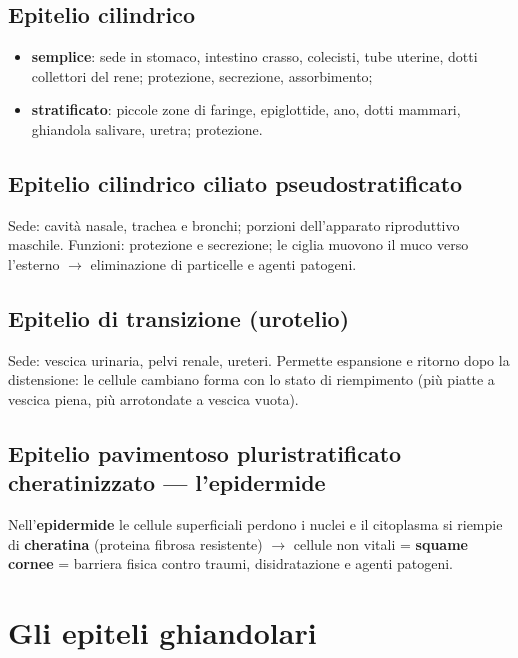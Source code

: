 \subsection{Epitelio cilindrico}
\begin{itemize}
  \item \textbf{semplice}: sede in stomaco, intestino crasso, colecisti, tube uterine, dotti
    collettori del rene; protezione, secrezione, assorbimento;
  \item \textbf{stratificato}: piccole zone di faringe, epiglottide, ano, dotti mammari, ghiandola
    salivare, uretra; protezione.
\end{itemize}

\subsection{Epitelio cilindrico ciliato pseudostratificato}
Sede: cavità nasale, trachea e bronchi; porzioni dell'apparato riproduttivo maschile. Funzioni:
protezione e secrezione; le ciglia muovono il muco verso l'esterno $\rightarrow$ eliminazione di
particelle e agenti patogeni.

\subsection{Epitelio di transizione (urotelio)}
Sede: vescica urinaria, pelvi renale, ureteri. Permette espansione e ritorno dopo la distensione:
le cellule cambiano forma con lo stato di riempimento (più piatte a vescica piena, più arrotondate
a vescica vuota).

\subsection{Epitelio pavimentoso pluristratificato cheratinizzato --- l'epidermide}
Nell'\textbf{epidermide} le cellule superficiali perdono i nuclei e il citoplasma si riempie di
\textbf{cheratina} (proteina fibrosa resistente) $\rightarrow$ cellule non vitali =
\textbf{squame cornee} = barriera fisica contro traumi, disidratazione e agenti patogeni.

\section{Gli epiteli ghiandolari}

